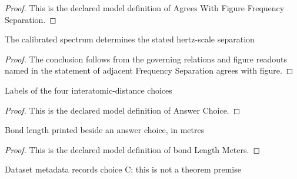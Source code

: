 \begin{proof}
  This is the declared model definition of Agrees With Figure Frequency Separation.
\end{proof}
\begin{lemma}
  \label{lem:physics:phyx-mini-0605:phyxminiproblems-problemphyxmini0605-adjacentfrequencyseparation-agrees-with-figure}
  The calibrated spectrum determines the stated hertz-scale separation
\end{lemma}
\begin{proof}
  The conclusion follows from the governing relations and figure readouts named in the statement of adjacent Frequency Separation agrees with figure.
\end{proof}
\begin{definition}
  \label{def:physics:phyx-mini-0605:phyxminiproblems-problemphyxmini0605-answerchoice}
  Labels of the four interatomic-distance choices
\end{definition}
\begin{proof}
  This is the declared model definition of Answer Choice.
\end{proof}
\begin{definition}
  \label{def:physics:phyx-mini-0605:phyxminiproblems-problemphyxmini0605-answerchoice-bondlengthmeters}
  Bond length printed beside an answer choice, in metres
\end{definition}
\begin{proof}
  This is the declared model definition of bond Length Meters.
\end{proof}
\begin{definition}
  \label{def:physics:phyx-mini-0605:phyxminiproblems-problemphyxmini0605-recordeddatasetanswer}
  Dataset metadata records choice C; this is not a theorem premise
\end{definition}

